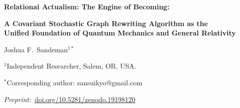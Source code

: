 \documentclass[11pt,a4paper]{article}
\theoremstyle{plain}
\theoremstyle{definition}
\theoremstyle{remark}
\begin{document}
\begin{center}
  {\LARGE\bfseries Relational Actualism: The Engine of Becoming:\par}
  \vspace{6pt}
  {\large\bfseries A Covariant Stochastic Graph Rewriting Algorithm as the\\
   Unified Foundation of Quantum Mechanics and General Relativity\par}
  \vspace{14pt}
  {\large Joshua F.\ Sandeman$^{1*}$\par}
  \vspace{4pt}
  {\normalsize $^{1}$Independent Researcher, Salem, OR, USA.\par}
  {\normalsize $^{*}$Corresponding author: sansuikyo@gmail.com\par}
  \vspace{8pt}
  {\small\textit{Preprint:}~\href{https://doi.org/10.5281/zenodo.19198120}
    {doi.org/10.5281/zenodo.19198120}\par}
  \vspace{14pt}
\end{center}
\end{document}
